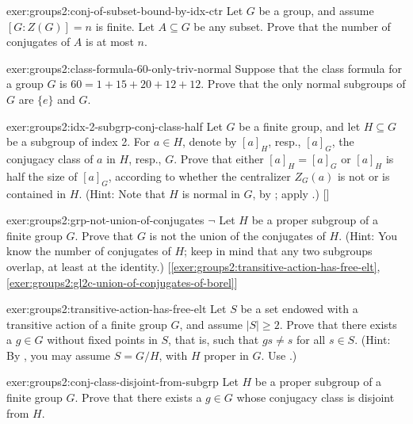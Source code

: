\begin{exer}{}{exer:groups2:conj-of-subset-bound-by-idx-ctr}
  Let $G$ be a group, and assume $[G : Z(G)] = n$ is finite. Let
  $A \subseteq G$ be any subset. Prove that the number of conjugates
  of $A$ is at most $n$.
\end{exer}
\begin{exer}{}{exer:groups2:class-formula-60-only-triv-normal}
  Suppose that the class formula for a group $G$ is
  $60 = 1 + 15 + 20 + 12 + 12$. Prove that the only normal subgroups
  of $G$ are $\{e\}$ and $G$.
\end{exer}
\begin{exer}{}{exer:groups2:idx-2-subgrp-conj-class-half}
  \exerused{} Let $G$ be a finite group, and let $H \subseteq G$ be a
  subgroup of index 2. For $a \in H$, denote by $[a]_H$, resp.,
  $[a]_G$, the conjugacy class of $a$ in $H$, resp., $G$. Prove that
  either $[a]_H = [a]_G$ or $[a]_H$ is half the size of $[a]_G$,
  according to whether the centralizer $Z_G(a)$ is not or is contained
  in $H$. (Hint: Note that $H$ is normal in $G$, by
  ; apply
  .)
  []
\end{exer}
\begin{exer}{}{exer:groups2:grp-not-union-of-conjugates}
  $\lnot$ Let $H$ be a proper subgroup of a finite group $G$. Prove
  that $G$ is not the union of the conjugates of $H$. (Hint: You know
  the number of conjugates of $H$; keep in mind that any two subgroups
  overlap, at least at the identity.)
  [\ref{exer:groups2:transitive-action-has-free-elt},
  \ref{exer:groups2:gl2c-union-of-conjugates-of-borel}]
\end{exer}
\begin{exer}{}{exer:groups2:transitive-action-has-free-elt}
  Let $S$ be a set endowed with a transitive action of a finite group
  $G$, and assume $|S| \geq 2$. Prove that there exists a $g \in G$
  without fixed points in $S$, that is, such that $gs \neq s$ for all
  $s \in S$. (Hint: By
  , you may assume
  $S = G/H$, with $H$ proper in $G$. Use
  .)
\end{exer}
\begin{exer}{}{exer:groups2:conj-class-disjoint-from-subgrp}
  Let $H$ be a proper subgroup of a finite group $G$. Prove that there
  exists a $g \in G$ whose conjugacy class is disjoint from $H$.
\end{exer}
